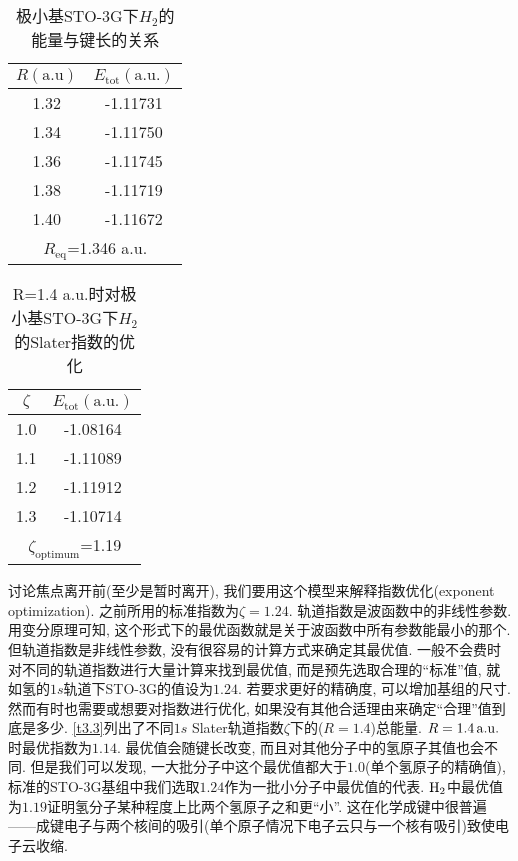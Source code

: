 \begin{table}[H]
	\centering
	\caption{极小基STO-3G下$H_2$的能量与键长的关系}
	\begin{tabular}{cc}
		\hline
		$R \mathrm{(a.u)}$ & $E_\mathrm{tot}\mathrm{(a.u.)}$\\\hline
		1.32      & -1.11731\\
		1.34     & -1.11750\\
		1.36     & -1.11745\\
		1.38     & -1.11719\\
		1.40     & -1.11672\\\hline
		\multicolumn{2}{c}{$R_\mathrm{eq}$=1.346 a.u.}
	\end{tabular}
	\label{t3.2}
\end{table}
\begin{table}[H]
	\centering
	\caption{R=1.4 a.u.时对极小基STO-3G下$H_2$的Slater指数的优化}
	\begin{tabular}{cc}
		\hline
		$\zeta$ & $E_\mathrm{tot} \mathrm{(a.u.)}$\\\hline
		1.0      & -1.08164\\
		1.1     & -1.11089\\
		1.2     & -1.11912\\
		1.3     & -1.10714\\\hline
		\multicolumn{2}{c}{$\zeta_\mathrm{optimum}$=1.19}
	\end{tabular}
	\label{t3.3}
\end{table}
讨论焦点离开前(至少是暂时离开), 
我们要用这个模型来解释指数优化(exponent optimization). 
之前所用的标准指数为$\zeta=1.24$. 
轨道指数是波函数中的非线性参数. 
用变分原理可知, 
这个形式下的最优函数就是关于波函数中所有参数能最小的那个. 
但轨道指数是非线性参数, 
没有很容易的计算方式来确定其最优值. 
一般不会费时对不同的轨道指数进行大量计算来找到最优值, 
而是预先选取合理的``标准''值, 
就如氢的$1s$轨道下STO-3G的值设为$1.24$. 
若要求更好的精确度, 
可以增加基组的尺寸. 
然而有时也需要或想要对指数进行优化, 
如果没有其他合适理由来确定``合理''值到底是多少. 
\autoref{t3.3}列出了不同$1s$ Slater轨道指数$\zeta$下的($R=1.4$)总能量. 
$R=1.4\,\mathrm{a.u.}$时最优指数为$1.14$. 
最优值会随键长改变, 
而且对其他分子中的氢原子其值也会不同. 
但是我们可以发现, 
一大批分子中这个最优值都大于$1.0$(单个氢原子的精确值), 
标准的STO-3G基组中我们选取$1.24$作为一批小分子中最优值的代表. 
$\mathrm{H}_2$中最优值为$1.19$证明氢分子某种程度上比两个氢原子之和更``小”. 
这在化学成键中很普遍——成键电子与两个核间的吸引(单个原子情况下电子云只与一个核有吸引)致使电子云收缩. 

